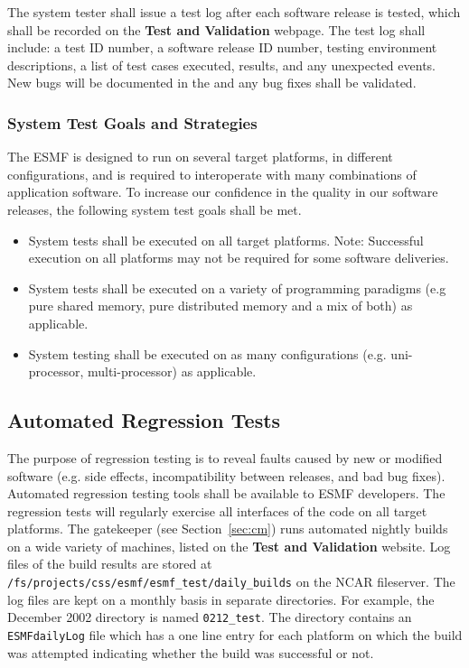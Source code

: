 The system tester shall issue a test log after each software release is tested,
which shall be recorded on the {\bf Test and Validation} webpage. The test 
log shall
include: a test ID number, a software release ID number, testing environment 
descriptions, a list of test cases executed, results, and any unexpected 
events. New bugs will be documented in the  and 
any bug fixes shall be validated.

\subsubsection{System Test Goals and Strategies}

The ESMF is designed to run on several target platforms, in different 
configurations, and is required to interoperate with many combinations 
of application software. To increase our confidence in the quality in 
our software releases, the following system test goals shall be met.

\begin{itemize}
\item System tests shall be executed on all target platforms. Note: Successful
execution on all platforms may not be required for some software deliveries.
\item System tests shall be executed on a variety of programming paradigms
(e.g pure shared memory, pure distributed memory and a mix of both) as
applicable.
\item System testing shall be executed on as many configurations (e.g. uni-processor,
multi-processor) as applicable.
\end{itemize}

\subsection{Automated Regression Tests}

The purpose of regression testing is to reveal faults caused by new
or modified software (e.g. side effects, incompatibility between 
releases, and bad bug fixes).  Automated regression testing tools shall 
be available to ESMF developers.  
The regression tests will regularly exercise all interfaces of the code on 
all target platforms.  The gatekeeper (see Section~\ref{sec:cm}) runs 
automated nightly builds on a wide variety of machines, listed on the
{\bf Test and Validation} website. 
Log files of the build results are stored at {\tt /fs/projects/css/esmf/esmf\_test/daily\_builds} on the NCAR fileserver. 
The log files are kept on a monthly basis in 
separate directories. For example, the December 2002 directory is named {\tt 0212\_test}. The 
directory contains an {\tt ESMFdailyLog} file which has a one line entry for each platform on 
which the build was attempted indicating whether the build was successful or not. 

